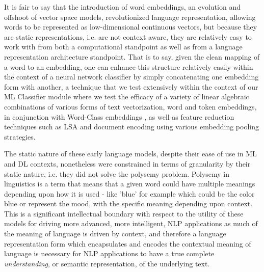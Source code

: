 \documentclass[final]{clv2025}
\begin{document}
It is fair to say that the introduction of word embeddings, an evolution and offshoot of vector space models, revolutionized language representation, allowing words to be represented as low-dimensional continuous vectors, but because they are static representations, i.e. are not context aware, they are relatively easy to work with from both a computational standpoint as well as from a language representation architecture standpoint. That is to say, given the clean mapping of a word to an embedding, one can enhance this structure relatively easily within the context of a neural network classifier by simply concatenating one embedding form with another, a technique that we test extensively within the context of our ML Classifier module where we test the efficacy of a variety of linear algebraic combinations of various forms of text vectorization, word and token embeddings, in conjunction with Word-Class embeddings \cite{moreo}, as well as feature reduction techniques such as LSA and document encoding using various embedding pooling strategies.

The static nature of these early language models, despite their ease of use in ML and DL contexts, nonetheless were constrained in terms of granularity by their static nature, i.e. they did not solve the polysemy problem. Polysemy in linguistics is a term that means that a given word could have multiple meanings depending upon how it is used - like 'blue' for example which could be the color blue or represent the mood, with the specific meaning depending upon context. This is a significant intellectual boundary with respect to the utility of these models for driving more advanced, more intelligent, NLP applications as much of the meaning of language is driven by context, and therefore a language representation form which encapsulates and encodes the contextual meaning of language is necessary for NLP applications to have a true complete \textit{understanding}, or semantic representation, of the underlying text.  
\end{document}
